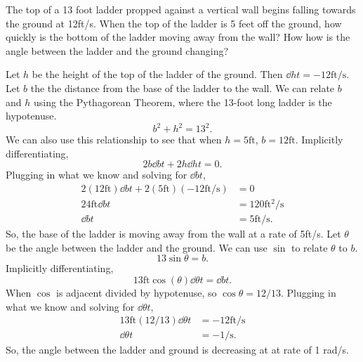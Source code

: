 \begin{example}
	The top of a 13 foot ladder propped against a vertical wall begins falling towards the ground at 12ft/s.
	When the top of the ladder is 5 feet off the ground, how quickly is the bottom of the ladder moving away from the wall?
	How how is the angle between the ladder and the ground changing?
\end{example}
Let $h$ be the height of the top of the ladder of the ground.
Then $\dd{h}{t} = -12\text{ft/s}$.
Let $b$ the the distance from the base of the ladder to the wall.
We can relate $b$ and $h$ using the Pythagorean Theorem, where the 13-foot long ladder is the hypotenuse.
\begin{equation*}
	b^2 + h^2 = 13^2.
\end{equation*}
\indent
We can also use this relationship to see that when $h=5\text{ft}$, $b=12\text{ft}$.
Implicitly differentiating,
\begin{equation*}
	2b\dd{b}{t} + 2h\dd{h}{t} = 0.
\end{equation*}
\indent
Plugging in what we know and solving for $\dd{b}{t}$,
\begin{align*}
	2(12\text{ft})\dd{b}{t} + 2(5\text{ft})(-12\text{ft/s}) &= 0 \\
	24\text{ft}\dd{b}{t} &= 120\text{ft$^2$/s} \\
	\dd{b}{t} &= 5\text{ft/s}.
\end{align*}
\indent
So, the base of the ladder is moving away from the wall at a rate of 5ft/s.
Let $\theta$ be the angle between the ladder and the ground.
We can use $\sin$ to relate $\theta$ to $b$.
\begin{equation*}
	13\sin{\theta} = b.
\end{equation*}
\indent
Implicitly differentiating,
\begin{equation*}
	13\text{ft}\cos{(\theta)}\dd{\theta}{t} = \dd{b}{t}.
\end{equation*}
\indent
When $\cos$ is adjacent divided by hypotenuse, so $\cos{\theta} = 12/13$.
Plugging in what we know and solving for $\dd{\theta}{t}$,
\begin{align*}
	13\text{ft}(12/13)\dd{\theta}{t} &= -12\text{ft/s} \\
	\dd{\theta}{t} &= -1\text{/s}.
\end{align*}
\indent
So, the angle between the ladder and ground is decreasing at at rate of 1 rad/s.

